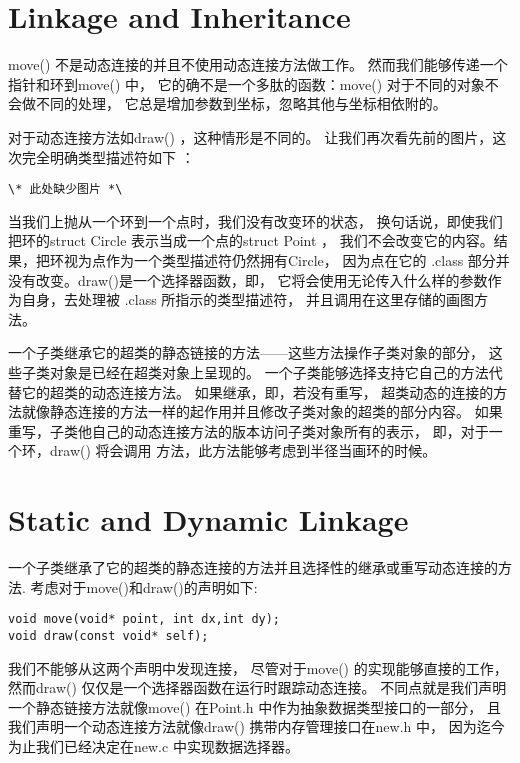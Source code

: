 \section{Linkage and Inheritance}
move() 不是动态连接的并且不使用动态连接方法做工作。
然而我们能够传递一个指针和环到move() 中，
它的确不是一个多肽的函数：move() 对于不同的对象不会做不同的处理，
它总是增加参数到坐标，忽略其他与坐标相依附的。

对于动态连接方法如draw() ，这种情形是不同的。
让我们再次看先前的图片，这次完全明确类型描述符如下 ：
\begin{lstlisting}
\* 此处缺少图片 *\
\end{lstlisting}

当我们上抛从一个环到一个点时，我们没有改变环的状态，
换句话说，即使我们把环的struct Circle 表示当成一个点的struct Point ，
我们不会改变它的内容。结果，把环视为点作为一个类型描述符仍然拥有Circle，
因为点在它的 .class 部分并没有改变。draw()是一个选择器函数，即，
它将会使用无论传入什么样的参数作为自身，去处理被 .class 所指示的类型描述符，
并且调用在这里存储的画图方法。

一个子类继承它的超类的静态链接的方法——这些方法操作子类对象的部分，
这些子类对象是已经在超类对象上呈现的。
一个子类能够选择支持它自己的方法代替它的超类的动态连接方法。
如果继承，即，若没有重写，
超类动态的连接的方法就像静态连接的方法一样的起作用并且修改子类对象的超类的部分内容。
如果重写，子类他自己的动态连接方法的版本访问子类对象所有的表示，
即，对于一个环，draw() 将会调用 方法，此方法能够考虑到半径当画环的时候。

\section{Static and Dynamic Linkage}
一个子类继承了它的超类的静态连接的方法并且选择性的继承或重写动态连接的方法.
考虑对于move()和draw()的声明如下:
\begin{lstlisting}
void move(void* point, int dx,int dy);
void draw(const void* self);
\end{lstlisting}

我们不能够从这两个声明中发现连接，
尽管对于move() 的实现能够直接的工作，
然而draw() 仅仅是一个选择器函数在运行时跟踪动态连接。
不同点就是我们声明一个静态链接方法就像move() 在Point.h 中作为抽象数据类型接口的一部分，
且我们声明一个动态连接方法就像draw() 携带内存管理接口在new.h 中，
因为迄今为止我们已经决定在new.c 中实现数据选择器。

